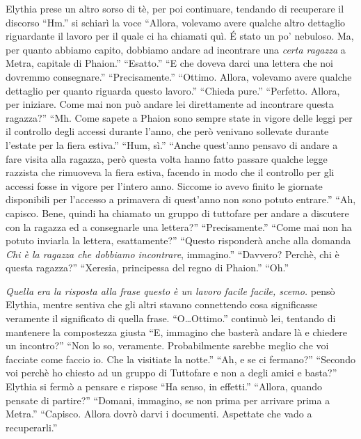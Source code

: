     Elythia prese un altro sorso di tè, per poi continuare, tendando di
    recuperare il discorso ``Hm.'' si schiarì la voce ``Allora, volevamo
    avere qualche altro dettaglio riguardante il lavoro per il quale ci ha
    chiamati quì. \'E stato un po' nebuloso. Ma, per quanto abbiamo capito,
    dobbiamo andare ad incontrare una \emph{certa ragazza} a Metra,
    capitale di Phaion.'' ``Esatto.'' ``E che doveva darci una lettera che
    noi dovremmo consegnare.'' ``Precisamente.'' ``Ottimo. Allora, volevamo
    avere qualche dettaglio per quanto riguarda questo lavoro.'' ``Chieda
    pure.'' ``Perfetto. Allora, per iniziare. Come mai non può andare lei
    direttamente ad incontrare questa ragazza?'' ``Mh. Come sapete a Phaion
    sono sempre state in vigore delle leggi per il controllo degli accessi
    durante l'anno, che però venivano sollevate durante l'estate per la
    fiera estiva.'' ``Hum, sì.'' ``Anche quest'anno pensavo di andare a
    fare visita alla ragazza, però questa volta hanno fatto passare qualche
    legge razzista che rimuoveva la fiera estiva, facendo in modo che il
    controllo per gli accessi fosse in vigore per l'intero anno. Siccome io
    avevo finito le giornate disponibili per l'accesso a primavera di
    quest'anno non sono potuto entrare.'' ``Ah, capisco. Bene, quindi ha
    chiamato un gruppo di tuttofare per andare a discutere con la ragazza
    ed a consegnarle una lettera?'' ``Precisamente.'' ``Come mai non ha
    potuto inviarla la lettera, esattamente?'' ``Questo risponderà anche
    alla domanda \emph{Chi è la ragazza che dobbiamo incontrare},
    immagino.'' ``Davvero? Perchè, chi è questa ragazza?'' ``Xeresia,
    principessa del regno di Phaion.'' ``Oh.''

    \emph{Quella era la risposta alla frase \emph{questo è un lavoro facile
    facile}, scemo.} pensò Elythia, mentre sentiva che gli altri stavano
    connettendo cosa significasse veramente il significato di quella frase.
    ``O\dots{}Ottimo.'' continuò lei, tentando di mantenere la compostezza
    giusta ``E, immagino che basterà andare là e chiedere un incontro?''
    ``Non lo so, veramente. Probabilmente sarebbe meglio che voi facciate
    come faccio io. Che la visitiate la notte.'' ``Ah, e se ci fermano?''
    ``Secondo voi perchè ho chiesto ad un gruppo di Tuttofare e non a degli
    amici e basta?'' Elythia si fermò a pensare e rispose ``Ha senso, in
    effetti.'' ``Allora, quando pensate di partire?'' ``Domani, immagino,
    se non prima per arrivare prima a Metra.'' ``Capisco. Allora dovrò
    darvi i documenti. Aspettate che vado a recuperarli.''

